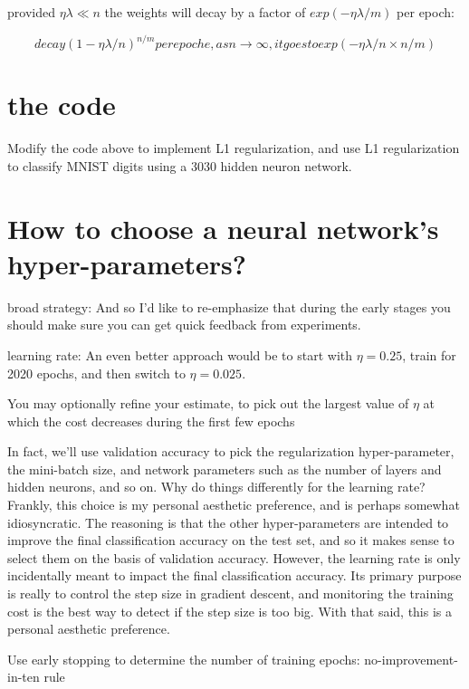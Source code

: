 \documentclass[]{book}
\begin{document}
provided \(\eta \lambda \ll n\) the weights will decay by a factor of
\(exp(−\eta\lambda/m)\) per epoch:

\begin{equation}
decay (1 - \eta\lambda / n)^{n / m} per epoche, as n \rightarrow \infty , it goes to exp(-\eta\lambda/n\times n /m)
\end{equation}

\section{the code}\label{the-code}

Modify the code above to implement L1 regularization, and use L1
regularization to classify MNIST digits using a 3030 hidden neuron
network.

\section{How to choose a neural network's
hyper-parameters?}\label{how-to-choose-a-neural-networks-hyper-parameters}

broad strategy: And so I'd like to re-emphasize that during the early
stages you should make sure you can get quick feedback from experiments.

learning rate: An even better approach would be to start with
\(\eta = 0.25\), train for 2020 epochs, and then switch to
\(\eta = 0.025\).

You may optionally refine your estimate, to pick out the largest value
of \(\eta\) at which the cost decreases during the first few epochs

In fact, we'll use validation accuracy to pick the regularization
hyper-parameter, the mini-batch size, and network parameters such as the
number of layers and hidden neurons, and so on. Why do things
differently for the learning rate? Frankly, this choice is my personal
aesthetic preference, and is perhaps somewhat idiosyncratic. The
reasoning is that the other hyper-parameters are intended to improve the
final classification accuracy on the test set, and so it makes sense to
select them on the basis of validation accuracy. However, the learning
rate is only incidentally meant to impact the final classification
accuracy. Its primary purpose is really to control the step size in
gradient descent, and monitoring the training cost is the best way to
detect if the step size is too big. With that said, this is a personal
aesthetic preference.

Use early stopping to determine the number of training epochs:
no-improvement-in-ten rule
\end{document}
